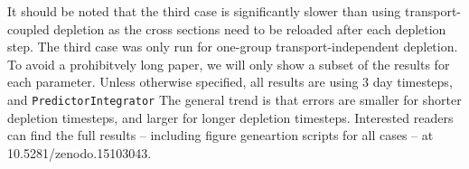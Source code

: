     It should be noted that the third case is significantly slower than using
    transport-coupled depletion as the cross sections need to be reloaded after
    each depletion step. The third case was only run for one-group
    transport-independent depletion. To avoid a prohibitvely long paper, we will
    only show a subset of the results for each parameter. Unless otherwise
    specified, all results are using 3 day timesteps, and
    \verb.PredictorIntegrator.  The general trend is that errors are smaller for
    shorter depletion timesteps, and larger for longer depletion timesteps.
    Interested readers can find the full results -- including figure geneartion
    scripts for all cases -- at 10.5281/zenodo.15103043.



